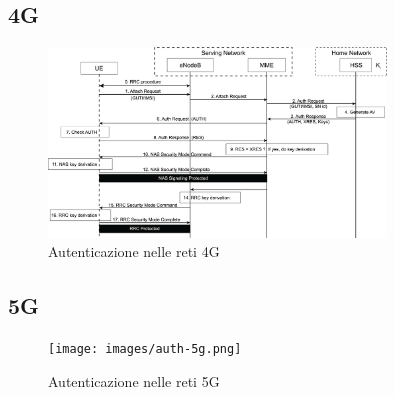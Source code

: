 \clearpage

\subsection{4G}
\begin{figure}[h]
    \centering
    \includegraphics[width=0.8\textwidth]{images/auth-4g.png}
    \caption{Autenticazione nelle reti 4G}
\end{figure}

\clearpage

\subsection{5G}

\begin{figure}[h]
    \centering
    \texttt{[image: images/auth-5g.png]}
    \caption{Autenticazione nelle reti 5G}
\end{figure}